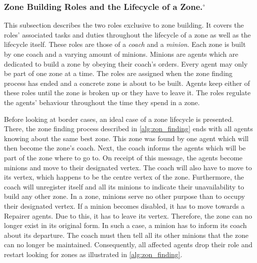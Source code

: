 \subsubsection[Zone Building Roles and the Lifecycle of a Zone.]{Zone Building Roles and the Lifecycle of a Zone.$^\circ$}\label{alg:zon_roles}
This subsection describes the two roles exclusive to zone building.
It covers the roles' associated tasks and duties throughout the lifecycle of a zone as well as the lifecycle itself.
These roles are those of a \emph{coach} and a \emph{minion}.
Each zone is built by one coach and a varying amount of minions.
Minions are agents which are dedicated to build a zone by obeying their coach's orders.
Every agent may only be part of one zone at a time.
The roles are assigned when the zone finding process has ended and a concrete zone is about to be built.
Agents keep either of these roles until the zone is broken up or they have to leave it.
The roles regulate the agents' behaviour throughout the time they spend in a zone.

Before looking at border cases, an ideal case of a zone lifecycle is presented.
There, the zone finding process described in \autoref{alg:zon_finding} ends with all agents knowing about the same best zone.
This zone was found by one agent which will then become the zone's coach.
Next, the coach informs the agents which will be part of the zone where to go to.
On receipt of this message, the agents become minions and move to their designated vertex.
The coach will also have to move to its vertex, which happens to be the centre vertex of the zone.
Furthermore, the coach will unregister itself and all its minions to indicate their unavailability to build any other zone.
In a zone, minions serve no other purpose than to occupy their designated vertex.
If a minion becomes disabled, it has to move towards a Repairer agents.
Due to this, it has to leave its vertex.
Therefore, the zone can no longer exist in its original form.
In such a case, a minion has to inform its coach about its departure.
The coach must then tell all its other minions that the zone can no longer be maintained.
Consequently, all affected agents drop their role and restart looking for zones as illustrated in \autoref{alg:zon_finding}.

